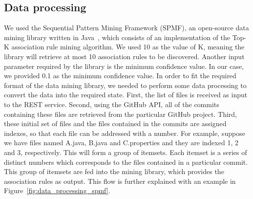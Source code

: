 \subsection{Data processing}
\label{sec:dataprocessing}

We used the Sequential Pattern Mining Framework (SPMF), an open-source data mining library written in Java~\cite{algo_impl}, which consists of an implementation of the Top-K association rule mining algorithm. We used 10 as the value of K, meaning the library will retrieve at most 10 association rules to be discovered. Another input parameter required by the library is the minimum confidence value. In our case, we provided 0.1 as the minimum confidence value. In order to fit the required format of the data mining library, we needed to perform some data processing to convert the data into the required state. First, the list of files is received as input to the REST service. Second, using the GitHub API, all of the commits containing these files are retrieved from the particular GitHub project. Third, these initial set of files and the files contained in the commits are assigned indexes, so that each file can be addressed with a number. For example, suppose  we have files named A.java, B.java and C.properties and they are indexed 1, 2 and 3, respectively. This will form a  group of itemsets. Each itemset is a series of distinct numbers which corresponds to the files contained in a particular commit. This group of itemsets are fed into the mining library, which provides the association rules as output. This flow is further explained with an example in Figure~\ref{fig:data_processing_spmf}.

